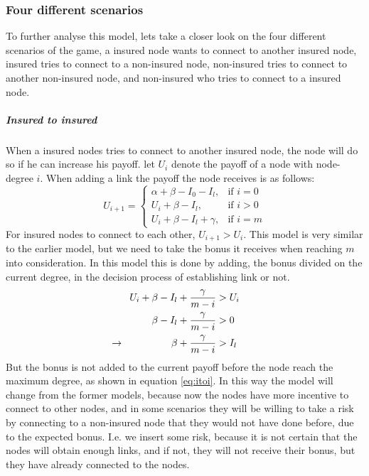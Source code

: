 \subsubsection{Four different scenarios}
To further analyse this model, lets take a closer look on the four different scenarios of the game, a insured node wants to connect to another insured node, insured tries to connect to a non-insured node, non-insured tries to connect to another non-insured node, and non-insured who tries to connect to a insured node.
\subparagraph{Insured to insured}
When a insured nodes tries to connect to another insured node, the node will do so if he can increase his payoff. 
let $U_{i}$ denote the payoff of a node with node-degree $i$. When adding a link the payoff the node receives is as follows:
\begin{equation}
    U_{i+1}= 
\begin{cases}
    \alpha + \beta - I_{0} - I_{l},& \text{if } i = 0\\
    U_{i}+\beta -I_{l},& \text{if }  i>0\\
    U_{i}+\beta -I_{l}+\gamma,& \text{if } i=m
    
\end{cases}
\label{eq:itoi}
\end{equation}
For insured nodes to connect to each other, $U_{i+1} > U_{i}$. This model is very similar to the earlier model, but we need to take the bonus it receives when reaching $m$ into consideration.
In this model this is done by adding, the bonus divided on the current degree, in the decision process of establishing link or not. 
\begin{eqnarray}
U_{i}+\beta-I_{l}+\frac{\gamma}{m-i}&>U_{i} \nonumber \\ 
\beta-I_{l}+\frac{\gamma}{m-i}&>0 \nonumber \\ 
\llap{$\rightarrow$\hspace{50pt}} \beta+\frac{\gamma}{m-i}&>I_{l} 
\label{eq:itoi2}
\end{eqnarray}
But the bonus is not added to the current payoff before the node reach the maximum degree, as shown in equation \ref{eq:itoi}.
In this way the model will change from the former models, because now the nodes have more incentive to connect to other nodes, and in some scenarios they will be willing to take a risk by connecting to a non-insured node that they would not have done before, due to the expected bonus. I.e. we insert some risk, because it is not certain that the nodes will obtain enough links, and if not, they will not receive their bonus, but they have already connected to the nodes.

